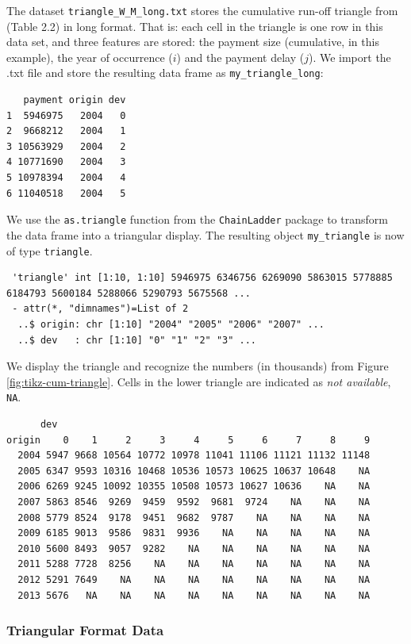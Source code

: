 \documentclass[]{book}
\begin{document}
The dataset \texttt{triangle\_W\_M\_long.txt} stores the cumulative
run-off triangle from \citet{WuthrichMerz2008} (Table 2.2) in long
format. That is: each cell in the triangle is one row in this data set,
and three features are stored: the payment size (cumulative, in this
example), the year of occurrence (\(i\)) and the payment delay (\(j\)).
We import the .txt file and store the resulting data frame as
\texttt{my\_triangle\_long}:

\begin{verbatim}
   payment origin dev
1  5946975   2004   0
2  9668212   2004   1
3 10563929   2004   2
4 10771690   2004   3
5 10978394   2004   4
6 11040518   2004   5
\end{verbatim}

We use the \texttt{as.triangle} function from the \texttt{ChainLadder}
package to transform the data frame into a triangular display. The
resulting object \texttt{my\_triangle} is now of type \texttt{triangle}.

\begin{verbatim}
 'triangle' int [1:10, 1:10] 5946975 6346756 6269090 5863015 5778885 6184793 5600184 5288066 5290793 5675568 ...
 - attr(*, "dimnames")=List of 2
  ..$ origin: chr [1:10] "2004" "2005" "2006" "2007" ...
  ..$ dev   : chr [1:10] "0" "1" "2" "3" ...
\end{verbatim}

We display the triangle and recognize the numbers (in thousands) from
Figure \ref{fig:tikz-cum-triangle}. Cells in the lower triangle are
indicated as \emph{not available}, \texttt{NA}.

\begin{verbatim}
      dev
origin    0    1     2     3     4     5     6     7     8     9
  2004 5947 9668 10564 10772 10978 11041 11106 11121 11132 11148
  2005 6347 9593 10316 10468 10536 10573 10625 10637 10648    NA
  2006 6269 9245 10092 10355 10508 10573 10627 10636    NA    NA
  2007 5863 8546  9269  9459  9592  9681  9724    NA    NA    NA
  2008 5779 8524  9178  9451  9682  9787    NA    NA    NA    NA
  2009 6185 9013  9586  9831  9936    NA    NA    NA    NA    NA
  2010 5600 8493  9057  9282    NA    NA    NA    NA    NA    NA
  2011 5288 7728  8256    NA    NA    NA    NA    NA    NA    NA
  2012 5291 7649    NA    NA    NA    NA    NA    NA    NA    NA
  2013 5676   NA    NA    NA    NA    NA    NA    NA    NA    NA
\end{verbatim}

\subsubsection*{Triangular Format Data}\label{triangular-format-data}
\end{document}
